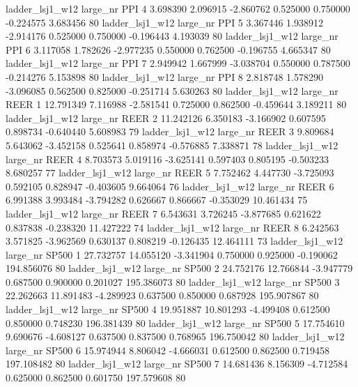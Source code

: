     ladder_lsj1_w12   large_nr      PPI                 4  3.698390  2.096915  -2.860762 0.525000 0.750000 -0.224575    3.683456 80
    ladder_lsj1_w12   large_nr      PPI                 5  3.367446  1.938912  -2.914176 0.525000 0.750000 -0.196443    4.193039 80
    ladder_lsj1_w12   large_nr      PPI                 6  3.117058  1.782626  -2.977235 0.550000 0.762500 -0.196755    4.665347 80
    ladder_lsj1_w12   large_nr      PPI                 7  2.949942  1.667999  -3.038704 0.550000 0.787500 -0.214276    5.153898 80
    ladder_lsj1_w12   large_nr      PPI                 8  2.818748  1.578290  -3.096085 0.562500 0.825000 -0.251714    5.630263 80
    ladder_lsj1_w12   large_nr     REER                 1 12.791349  7.116988  -2.581541 0.725000 0.862500 -0.459644    3.189211 80
    ladder_lsj1_w12   large_nr     REER                 2 11.242126  6.350183  -3.166902 0.607595 0.898734 -0.640440    5.608983 79
    ladder_lsj1_w12   large_nr     REER                 3  9.809684  5.643062  -3.452158 0.525641 0.858974 -0.576885    7.338871 78
    ladder_lsj1_w12   large_nr     REER                 4  8.703573  5.019116  -3.625141 0.597403 0.805195 -0.503233    8.680257 77
    ladder_lsj1_w12   large_nr     REER                 5  7.752462  4.447730  -3.725093 0.592105 0.828947 -0.403605    9.664064 76
    ladder_lsj1_w12   large_nr     REER                 6  6.991388  3.993484  -3.794282 0.626667 0.866667 -0.353029   10.461434 75
    ladder_lsj1_w12   large_nr     REER                 7  6.543631  3.726245  -3.877685 0.621622 0.837838 -0.238320   11.427222 74
    ladder_lsj1_w12   large_nr     REER                 8  6.242563  3.571825  -3.962569 0.630137 0.808219 -0.126435   12.464111 73
    ladder_lsj1_w12   large_nr    SP500                 1 27.732757 14.055120  -3.341904 0.750000 0.925000 -0.190062  194.856076 80
    ladder_lsj1_w12   large_nr    SP500                 2 24.752176 12.766844  -3.947779 0.687500 0.900000  0.201027  195.386073 80
    ladder_lsj1_w12   large_nr    SP500                 3 22.262663 11.891483  -4.289923 0.637500 0.850000  0.687928  195.907867 80
    ladder_lsj1_w12   large_nr    SP500                 4 19.951887 10.801293  -4.499408 0.612500 0.850000  0.748230  196.381439 80
    ladder_lsj1_w12   large_nr    SP500                 5 17.754610  9.690676  -4.608127 0.637500 0.837500  0.768965  196.750042 80
    ladder_lsj1_w12   large_nr    SP500                 6 15.974944  8.806042  -4.666031 0.612500 0.862500  0.719458  197.108482 80
    ladder_lsj1_w12   large_nr    SP500                 7 14.681436  8.156309  -4.712584 0.625000 0.862500  0.601750  197.579608 80
